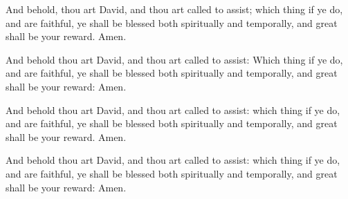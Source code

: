 		And behold, thou art David, and thou art called to assist; which thing if ye do, and are faithful, ye shall be blessed both spiritually and temporally, and great shall be your reward. Amen.

		\begin{framed}
		\scriptsize
			\begin{compactdesc}
				\item[JSP] And behold thou art David, and thou art called to assist: Which thing if ye do, and are faithful, ye shall be blessed both spiritually and temporally, and great shall be your reward: Amen.
				\item[DC 1835] And behold thou art David, and thou art called to assist: which thing if ye do, and are faithful, ye shall be blessed both spiritually and temporally, and great shall be your reward. Amen.
				\item[DC 1844] And behold thou art David, and thou art called to assist: which thing if ye do, and are faithful, ye shall be blessed both spiritually and temporally, and great shall be your reward: Amen.
			\end{compactdesc}
		\end{framed}